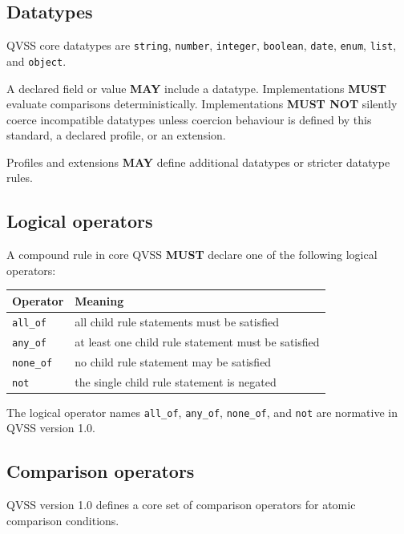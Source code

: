 \documentclass[11pt,a4paper]{article}
\begin{document}
\subsection{Datatypes}

QVSS core datatypes are \texttt{string}, \texttt{number}, \texttt{integer}, \texttt{boolean}, \texttt{date}, \texttt{enum}, \texttt{list}, and \texttt{object}.

A declared field or value \textbf{MAY} include a datatype. Implementations \textbf{MUST} evaluate comparisons deterministically. Implementations \textbf{MUST NOT} silently coerce incompatible datatypes unless coercion behaviour is defined by this standard, a declared profile, or an extension.

Profiles and extensions \textbf{MAY} define additional datatypes or stricter datatype rules.

\subsection{Logical operators}

A compound rule in core QVSS \textbf{MUST} declare one of the following logical operators:

\begin{center}
\begin{tabular}{ll}
\toprule
\textbf{Operator} & \textbf{Meaning} \\
\midrule
\texttt{all\_of} & all child rule statements must be satisfied \\
\texttt{any\_of} & at least one child rule statement must be satisfied \\
\texttt{none\_of} & no child rule statement may be satisfied \\
\texttt{not} & the single child rule statement is negated \\
\bottomrule
\end{tabular}
\end{center}

The logical operator names \texttt{all\_of}, \texttt{any\_of}, \texttt{none\_of}, and \texttt{not} are normative in QVSS version 1.0.

\subsection{Comparison operators}

QVSS version 1.0 defines a core set of comparison operators for atomic comparison conditions.
\end{document}
